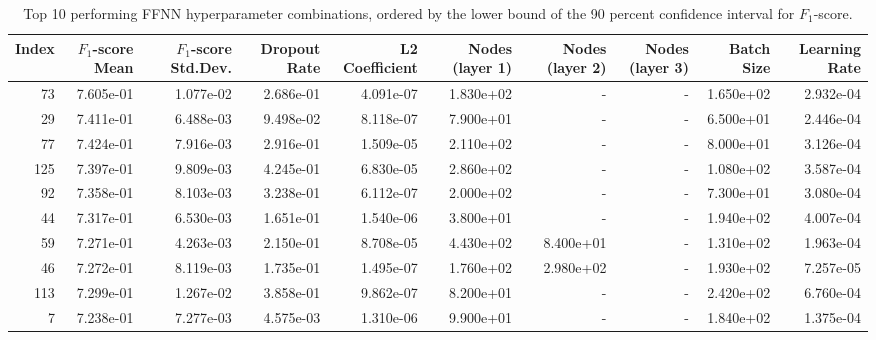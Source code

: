 \begin{table}
\caption[Best FFNN Hyperparameter Combinations]{Top 10 performing FFNN hyperparameter combinations, ordered by the lower bound of the 90 percent confidence interval for $F_1$-score.}
\label{tab:appendix_best_ffnn_hpars}
\begin{adjustbox}{width=1\textwidth}
\begin{tabular}{rrrrrrrrrr}
\toprule
Index & $F_1$-score Mean & $F_1$-score Std.Dev. & Dropout Rate & L2 Coefficient & Nodes (layer 1) & Nodes (layer 2) & Nodes (layer 3) & Batch Size & Learning Rate \\
\midrule
73 & 7.605e-01 & 1.077e-02 & 2.686e-01 & 4.091e-07 & 1.830e+02 & - & - & 1.650e+02 & 2.932e-04 \\
29 & 7.411e-01 & 6.488e-03 & 9.498e-02 & 8.118e-07 & 7.900e+01 & - & - & 6.500e+01 & 2.446e-04 \\
77 & 7.424e-01 & 7.916e-03 & 2.916e-01 & 1.509e-05 & 2.110e+02 & - & - & 8.000e+01 & 3.126e-04 \\
125 & 7.397e-01 & 9.809e-03 & 4.245e-01 & 6.830e-05 & 2.860e+02 & - & - & 1.080e+02 & 3.587e-04 \\
92 & 7.358e-01 & 8.103e-03 & 3.238e-01 & 6.112e-07 & 2.000e+02 & - & - & 7.300e+01 & 3.080e-04 \\
44 & 7.317e-01 & 6.530e-03 & 1.651e-01 & 1.540e-06 & 3.800e+01 & - & - & 1.940e+02 & 4.007e-04 \\
59 & 7.271e-01 & 4.263e-03 & 2.150e-01 & 8.708e-05 & 4.430e+02 & 8.400e+01 & - & 1.310e+02 & 1.963e-04 \\
46 & 7.272e-01 & 8.119e-03 & 1.735e-01 & 1.495e-07 & 1.760e+02 & 2.980e+02 & - & 1.930e+02 & 7.257e-05 \\
113 & 7.299e-01 & 1.267e-02 & 3.858e-01 & 9.862e-07 & 8.200e+01 & - & - & 2.420e+02 & 6.760e-04 \\
7 & 7.238e-01 & 7.277e-03 & 4.575e-03 & 1.310e-06 & 9.900e+01 & - & - & 1.840e+02 & 1.375e-04 \\
\bottomrule
\end{tabular}
\end{adjustbox}
\end{table}
